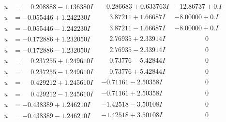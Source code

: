\documentclass[1p]{elsarticle_modified}
\theoremstyle{definition}
\begin{document}
$$\begin{array}{c|c|c}
\begin{aligned}
u &= \phantom{-}0.208888 - 1.136380 I\end{aligned}
 & -0.286683 + 0.633763 I & -12.86737 + 0. I\phantom{ +0.000000I} \\ \hline\begin{aligned}
u &= -0.055446 + 1.242230 I\end{aligned}
 & \phantom{-}3.87211 + 1.66687 I & -8.00000 + 0. I\phantom{ +0.000000I} \\ \hline\begin{aligned}
u &= -0.055446 - 1.242230 I\end{aligned}
 & \phantom{-}3.87211 - 1.66687 I & -8.00000 + 0. I\phantom{ +0.000000I} \\ \hline\begin{aligned}
u &= -0.172886 + 1.232050 I\end{aligned}
 & \phantom{-}2.76935 + 2.33914 I & \phantom{-0.000000 } 0 \\ \hline\begin{aligned}
u &= -0.172886 - 1.232050 I\end{aligned}
 & \phantom{-}2.76935 - 2.33914 I & \phantom{-0.000000 } 0 \\ \hline\begin{aligned}
u &= \phantom{-}0.237255 + 1.249610 I\end{aligned}
 & \phantom{-}0.73776 - 5.42844 I & \phantom{-0.000000 } 0 \\ \hline\begin{aligned}
u &= \phantom{-}0.237255 - 1.249610 I\end{aligned}
 & \phantom{-}0.73776 + 5.42844 I & \phantom{-0.000000 } 0 \\ \hline\begin{aligned}
u &= \phantom{-}0.429212 + 1.245610 I\end{aligned}
 & -0.71161 - 2.50358 I & \phantom{-0.000000 } 0 \\ \hline\begin{aligned}
u &= \phantom{-}0.429212 - 1.245610 I\end{aligned}
 & -0.71161 + 2.50358 I & \phantom{-0.000000 } 0 \\ \hline\begin{aligned}
u &= -0.438389 + 1.246210 I\end{aligned}
 & -1.42518 - 3.50108 I & \phantom{-0.000000 } 0 \\ \hline\begin{aligned}
u &= -0.438389 - 1.246210 I\end{aligned}
 & -1.42518 + 3.50108 I & \phantom{-0.000000 } 0 \\ \hline\begin{aligned}

\end{aligned}
\end{array}$$
\end{document}
